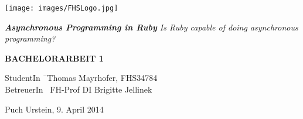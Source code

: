 \begin{titlepage}
\begin{center}

\texttt{[image: images/FHSLogo.jpg]}

\vspace*{4cm}

\Large{
	\textit{
		\textbf{Asynchronous Programming in Ruby} 
		\linebreak 
		Is Ruby capable of doing asynchronous programming?
	}
}

\vspace*{4cm}

\large{
	\textbf{BACHELORARBEIT 1}
}

\end{center}

\vfill

\begin{tabbing}
StudentIn \= \ Thomas Mayrhofer, FHS34784 \\
BetreuerIn \> \ FH-Prof DI Brigitte Jellinek
\end{tabbing}

Puch Urstein, 9. April 2014

\end{titlepage}